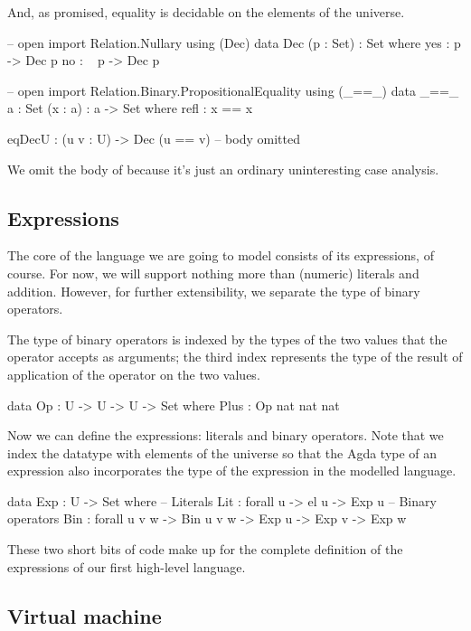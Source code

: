\noindent And, as promised, equality is decidable on the elements of the
universe.

\begin{code}
  -- open import Relation.Nullary using (Dec)
  data Dec (p : Set) : Set where
    yes : p -> Dec p
    no  : ~ p -> Dec p

  -- open import Relation.Binary.PropositionalEquality using (_==_)
  data _==_ {a : Set} (x : a) : a -> Set where
    refl : x == x

  eqDecU : (u v : U) -> Dec (u == v)
  -- body omitted
\end{code}

\noindent We omit the body of  because it's just an ordinary
uninteresting case analysis.

\subsection{Expressions}

The core of the language we are going to model consists of its expressions, of
course. For now, we will support nothing more than (numeric) literals and addition.
However, for further extensibility, we separate the type of binary operators.

The type of binary operators is indexed by the types of the two values that
the operator accepts as arguments; the third index represents the type of
the result of application of the operator on the two values.

\begin{code}
  data Op : U -> U -> U -> Set where
    Plus : Op nat nat nat
\end{code}

\noindent Now we can define the expressions: literals and binary operators.
Note that we index the datatype with elements of the universe  so that
the Agda type of an expression also incorporates the type of the expression in
the modelled language.

\begin{code}
  data Exp : U -> Set where
    -- Literals
    Lit : forall {u} -> el u -> Exp u
    -- Binary operators
    Bin : forall {u v w} -> Bin u v w -> Exp u -> Exp v -> Exp w
\end{code}

These two short bits of code make up for the complete definition of the expressions
of our first high-level language.

\subsection{Virtual machine}

